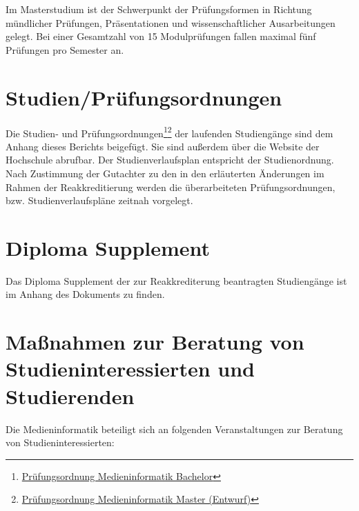 Im Masterstudium ist der Schwerpunkt der Prüfungsformen in Richtung
mündlicher Prüfungen, Präsentationen und wissenschaftlicher
Ausarbeitungen gelegt. Bei einer Gesamtzahl von 15 Modulprüfungen fallen
maximal fünf Prüfungen pro Semester an.

\section{Studien/Prüfungsordnungen\label{/mi-2017/selbstbericht/0500-studierbarkeit/0000-studierbarkeit}}\label{studienpruxfcfungsordnungenpathlabelmi-2017selbstbericht0500-studierbarkeit0000-studierbarkeit}

Die Studien- und Prüfungsordnungen\footnote{\href{https://www.th-koeln.de/studium/medieninformatik-bachelor--ordnungen-und-formulare_3963.php}{Prüfungsordnung
  Medieninformatik Bachelor}}\footnote{\href{https://th-koeln.github.io/mi-2017/anhaenge/ma-MIMPO_Entwurf_20170218.pdf}{Prüfungsordnung
  Medieninformatik Master (Entwurf)}} der laufenden Studiengänge sind
dem Anhang dieses Berichts beigefügt. Sie sind außerdem über die Website
der Hochschule abrufbar. Der Studienverlaufsplan entspricht der
Studienordnung. Nach Zustimmung der Gutachter zu den in den erläuterten
Änderungen im Rahmen der Reakkreditierung werden die überarbeiteten
Prüfungsordnungen, bzw. Studienverlaufspläne zeitnah vorgelegt.

\section{Diploma
Supplement\label{/mi-2017/selbstbericht/0500-studierbarkeit/0000-studierbarkeit}}\label{diploma-supplementpathlabelmi-2017selbstbericht0500-studierbarkeit0000-studierbarkeit}

Das Diploma Supplement der zur Reakkrediterung beantragten Studiengänge
ist im Anhang des Dokuments zu finden.

\section{Maßnahmen zur Beratung von Studieninteressierten und
Studierenden\label{/mi-2017/selbstbericht/0500-studierbarkeit/0000-studierbarkeit}}\label{mauxdfnahmen-zur-beratung-von-studieninteressierten-und-studierendenpathlabelmi-2017selbstbericht0500-studierbarkeit0000-studierbarkeit}

Die Medieninformatik beteiligt sich an folgenden Veranstaltungen zur
Beratung von Studieninteressierten:


